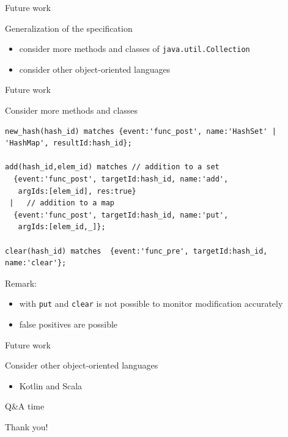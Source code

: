 \documentclass[10pt,usenames,dvipsnames]{beamer}
\begin{document}

\begin{frame}[fragile]{Future work}
  \begin{block}{Generalization of the specification}
    \begin{itemize}
    \item consider more methods and classes of \lstinline{java.util.Collection}
    \item consider other object-oriented languages
    \end{itemize}
  \end{block}
\end{frame}


\begin{frame}[fragile]{Future work}
  \begin{block}{Consider more methods and classes}
    \begin{lstlisting}[basicstyle=\ttfamily\footnotesize]
new_hash(hash_id) matches {event:'func_post', name:'HashSet' | 'HashMap', resultId:hash_id};

add(hash_id,elem_id) matches // addition to a set
  {event:'func_post', targetId:hash_id, name:'add',  
   argIds:[elem_id], res:true}
 |   // addition to a map  
  {event:'func_post', targetId:hash_id, name:'put',  
   argIds:[elem_id,_]};

clear(hash_id) matches  {event:'func_pre', targetId:hash_id, name:'clear'}; 
    \end{lstlisting}

  \end{block}
  \alert{Remark:}
  \begin{itemize}
  \item with \lstinline{put} and \lstinline{clear} is not possible to monitor modification accurately
  \item false positives are possible
  \end{itemize}
  \end{frame}


\begin{frame}[fragile]{Future work}
  \begin{block}{Consider other object-oriented languages}
  \begin{itemize}
  \item Kotlin and Scala
  \end{itemize}
  \end{block}
  \end{frame}


\begin{frame}{Q\&A time}
\vspace*{16ex}
  \begin{center}
  \LARGE Thank you!
\end{center}
\end{frame}
\end{document}
